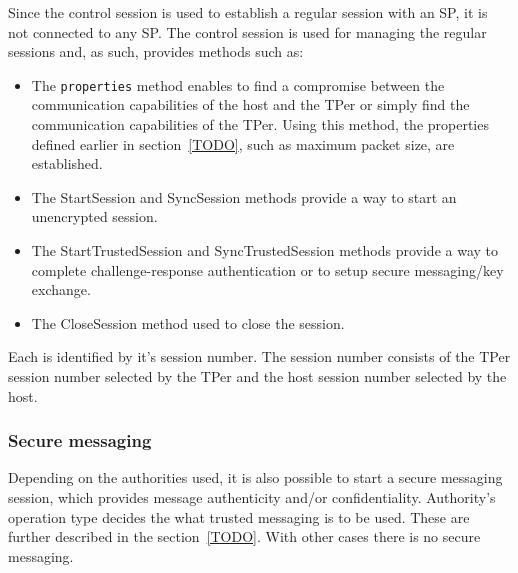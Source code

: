 Since the control session is used to establish a regular session with an SP, it is not connected to any SP. The control session is used for managing the regular sessions and, as such, provides methods such as:
\begin{itemize}
\item The \verb|properties| method enables to find a compromise between the communication capabilities of the host and the TPer or simply find the communication capabilities of the TPer. Using this method, the properties defined earlier in section~\ref{TODO}, such as maximum packet size, are established.
\item The StartSession and SyncSession methods provide a way to start an unencrypted session.
\item The StartTrustedSession and SyncTrustedSession methods provide a way to complete challenge-response authentication or to setup secure messaging/key exchange.
\item The CloseSession method used to close the session.
\end{itemize}

Each is identified by it's session number. The session number consists of the TPer session number selected by the TPer and the host session number selected by the host.




\subsubsection{Secure messaging}

Depending on the authorities used, it is also possible to start a secure messaging session, which provides message authenticity and/or confidentiality.
Authority's operation type decides the what trusted messaging is to be used. These are further described in the section~\ref{TODO}.
With other cases there is no secure messaging.


